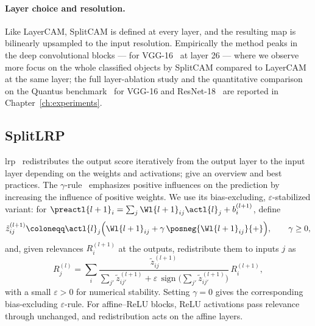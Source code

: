 \paragraph{Layer choice and resolution.}
Like LayerCAM, SplitCAM is defined at every layer, and the resulting map is bilinearly upsampled to the input resolution. Empirically the method peaks in the deep convolutional blocks --- for VGG-16~\parencite{Simonyan2015} at layer 26 --- where we observe more focus on the whole classified objects by SplitCAM compared to LayerCAM at the same layer; the full layer-ablation study and the quantitative comparison on the Quantus benchmark~\parencite{Hedstrom2023} for VGG-16 and ResNet-18~\parencite{He2016resnet} are reported in Chapter~\ref{ch:experiments}.

\subsection{SplitLRP}\label{sec:split_lrp}

\ac{lrp}~\parencite{Bach2015} redistributes the output score iteratively from the output layer to the input layer depending on the weights and activations; \textcite{Montavon2018} give an overview and \textcite{Kohlbrenner2020} best practices. The $\gamma$-rule~\parencite{Montavon_2022_gammaLRP} emphasizes positive influences on the prediction by increasing the influence of positive weights. We use its bias-excluding, $\varepsilon$-stabilized variant: for $\preactl{l+1}_i=\sum_j\Wl{l+1}_{ij}\actl{l}_j+b^{(l+1)}_i$, define
\begin{equation}
	\tilde{z}^{(l+1)}_{ij} \coloneqq \actl{l}_j \Bigl( \Wl{l+1}_{ij} + \gamma\, \posneg{\Wl{l+1}_{ij}}{+} \Bigr),
	\qquad \gamma \geq 0,
	\label{eq:gamma_contribution}
\end{equation}
and, given relevances $R^{(l+1)}_i$ at the outputs, redistribute them to inputs $j$ as
\begin{equation}
	R^{(l)}_j = \sum_i \frac{\tilde{z}^{(l+1)}_{ij}}{\sum_{j'} \tilde{z}^{(l+1)}_{ij'} + \varepsilon \, \operatorname{sign}\bigl( \sum_{j'} \tilde{z}^{(l+1)}_{ij'} \bigr)} \, R^{(l+1)}_i,
	\label{eq:lrp_gamma_rule}
\end{equation}
with a small $\varepsilon > 0$ for numerical stability. Setting $\gamma = 0$ gives the corresponding bias-excluding $\varepsilon$-rule. For affine--ReLU blocks, ReLU activations pass relevance through unchanged, and redistribution acts on the affine layers.

